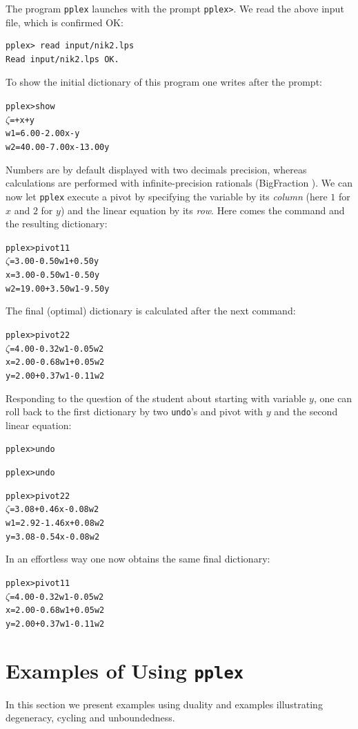 \documentclass[ukenglish,a4]{article}
\begin{document}
The program \texttt{pplex} launches with the prompt \verb|pplex>|.
We read the above input file, which is confirmed OK:
\begin{verbatim}
pplex> read input/nik2.lps
Read input/nik2.lps OK.
\end{verbatim}
To show the initial dictionary of this program one writes after the prompt:
\begin{alltt}
pplex> show
 \(\zeta\) =       +     x +      y
w1 =  6.00 - 2.00x -      y
w2 = 40.00 - 7.00x - 13.00y
\end{alltt}
Numbers are by default displayed with two decimals precision, whereas
calculations are performed with infinite-precision rationals (BigFraction \cite{BigFraction}).
We can now let \texttt{pplex} execute a pivot by specifying
the variable by its \emph{column} (here $1$ for $x$ and $2$ for $y$)
and the linear equation by its \emph{row}. 
Here comes the command and the resulting dictionary:
\begin{alltt}
pplex> pivot 1 1
 \(\zeta\) =  3.00 - 0.50w1 + 0.50y
 x =  3.00 - 0.50w1 - 0.50y
w2 = 19.00 + 3.50w1 - 9.50y
\end{alltt}
The final (optimal) dictionary is calculated after the next command:
\begin{alltt}
pplex> pivot 2 2
 \(\zeta\) = 4.00 - 0.32w1 - 0.05w2
 x = 2.00 - 0.68w1 + 0.05w2
 y = 2.00 + 0.37w1 - 0.11w2
\end{alltt}
Responding to the question of the student about starting with variable $y$, 
one can roll back to the first dictionary by two \verb|undo|'s and pivot
with $y$ and the second linear equation:
\begin{alltt}
pplex> undo

pplex> undo

pplex> pivot 2 2
 \(\zeta\) = 3.08 + 0.46x - 0.08w2
w1 = 2.92 - 1.46x + 0.08w2
 y = 3.08 - 0.54x - 0.08w2
\end{alltt}
In an effortless way one now obtains the same final dictionary:
\begin{alltt}
pplex> pivot 1 1 
 \(\zeta\) = 4.00 - 0.32w1 - 0.05w2
 x = 2.00 - 0.68w1 + 0.05w2
 y = 2.00 + 0.37w1 - 0.11w2
\end{alltt}

\section{Examples of Using \texttt{pplex}}\label{sec:examples}
In this section we present examples using duality and examples illustrating
degeneracy, cycling and unboundedness.
\end{document}
